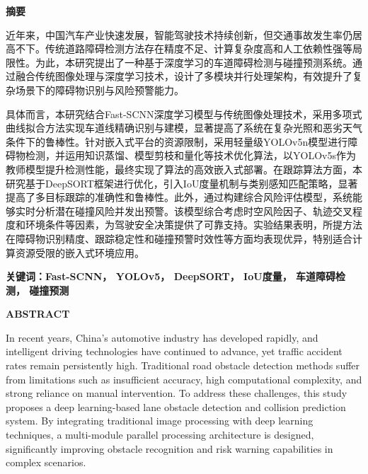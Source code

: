 \documentclass[a4paper, UTF8, fontsize=12pt]{ctexart} %
\numberwithin{equation}{section} %
\begin{document}
\newpage
{}
\begin{center}
\Large\textbf{摘要}
\end{center}
\vspace{2em}

\setlength{\parindent}{2em} %

近年来，中国汽车产业快速发展，智能驾驶技术持续创新，但交通事故发生率仍居高不下。传统道路障碍检测方法存在精度不足、计算复杂度高和人工依赖性强等局限性。为此，本研究提出了一种基于深度学习的车道障碍检测与碰撞预测系统。通过融合传统图像处理与深度学习技术，设计了多模块并行处理架构，有效提升了复杂场景下的障碍物识别与风险预警能力。


具体而言，本研究结合Fast-SCNN深度学习模型与传统图像处理技术，采用多项式曲线拟合方法实现车道线精确识别与建模，显著提高了系统在复杂光照和恶劣天气条件下的鲁棒性。针对嵌入式平台的资源限制，采用轻量级YOLOv5n模型进行障碍物检测，并运用知识蒸馏、模型剪枝和量化等技术优化算法，以YOLOv5s作为教师模型提升检测性能，最终实现了算法的高效嵌入式部署。在跟踪算法方面，本研究基于DeepSORT框架进行优化，引入IoU度量机制与类别感知匹配策略，显著提高了多目标跟踪的准确性和鲁棒性。此外，通过构建综合风险评估模型，系统能够实时分析潜在碰撞风险并发出预警。该模型综合考虑时空风险因子、轨迹交叉程度和环境条件等因素，为驾驶安全决策提供了可靠支持。实验结果表明，所提方法在障碍物识别精度、跟踪稳定性和碰撞预警时效性等方面均表现优异，特别适合计算资源受限的嵌入式环境应用。


\vspace{2em}
\noindent\textbf{关键词：Fast-SCNN， YOLOv5， DeepSORT， IoU度量， 车道障碍检测， 碰撞预测}
\thispagestyle{fancy} %

\clearpage

\newpage
{}
\begin{center}
\Large\textbf{ABSTRACT}
\end{center}
\vspace{2em}

\setlength{\parindent}{2em} %

In recent years, China's automotive industry has developed rapidly, and intelligent driving technologies have continued to advance, yet traffic accident rates remain persistently high. Traditional road obstacle detection methods suffer from limitations such as insufficient accuracy, high computational complexity, and strong reliance on manual intervention. To address these challenges, this study proposes a deep learning-based lane obstacle detection and collision prediction system. By integrating traditional image processing with deep learning techniques, a multi-module parallel processing architecture is designed, significantly improving obstacle recognition and risk warning capabilities in complex scenarios.
\end{document}
